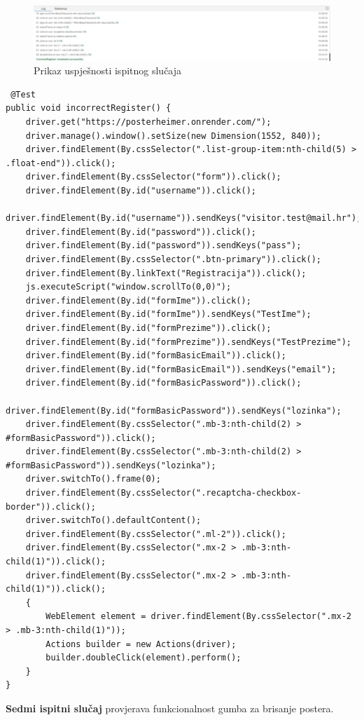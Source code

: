 			\begin{figure} [hbt!]
	\includegraphics[width=\linewidth]{Slike/IncorrectRegister}
	\caption{Prikaz uspješnosti ispitnog slučaja}
			\end{figure}

			\begin{lstlisting}
 @Test
public void incorrectRegister() {
	driver.get("https://posterheimer.onrender.com/");
	driver.manage().window().setSize(new Dimension(1552, 840));
	driver.findElement(By.cssSelector(".list-group-item:nth-child(5) > .float-end")).click();
	driver.findElement(By.cssSelector("form")).click();
	driver.findElement(By.id("username")).click();
	driver.findElement(By.id("username")).sendKeys("visitor.test@mail.hr");
	driver.findElement(By.id("password")).click();
	driver.findElement(By.id("password")).sendKeys("pass");
	driver.findElement(By.cssSelector(".btn-primary")).click();
	driver.findElement(By.linkText("Registracija")).click();
	js.executeScript("window.scrollTo(0,0)");
	driver.findElement(By.id("formIme")).click();
	driver.findElement(By.id("formIme")).sendKeys("TestIme");
	driver.findElement(By.id("formPrezime")).click();
	driver.findElement(By.id("formPrezime")).sendKeys("TestPrezime");
	driver.findElement(By.id("formBasicEmail")).click();
	driver.findElement(By.id("formBasicEmail")).sendKeys("email");
	driver.findElement(By.id("formBasicPassword")).click();
	driver.findElement(By.id("formBasicPassword")).sendKeys("lozinka");
	driver.findElement(By.cssSelector(".mb-3:nth-child(2) > #formBasicPassword")).click();
	driver.findElement(By.cssSelector(".mb-3:nth-child(2) > #formBasicPassword")).sendKeys("lozinka");
	driver.switchTo().frame(0);
	driver.findElement(By.cssSelector(".recaptcha-checkbox-border")).click();
	driver.switchTo().defaultContent();
	driver.findElement(By.cssSelector(".ml-2")).click();
	driver.findElement(By.cssSelector(".mx-2 > .mb-3:nth-child(1)")).click();
	driver.findElement(By.cssSelector(".mx-2 > .mb-3:nth-child(1)")).click();
	{
		WebElement element = driver.findElement(By.cssSelector(".mx-2 > .mb-3:nth-child(1)"));
		Actions builder = new Actions(driver);
		builder.doubleClick(element).perform();
	}
}
			\end{lstlisting}
			
\textbf{Sedmi ispitni slučaj} provjerava funkcionalnost gumba za brisanje postera.
			

